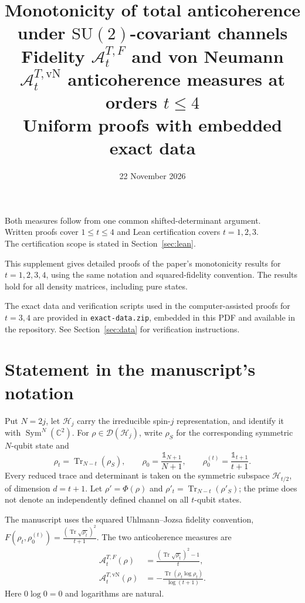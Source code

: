 \documentclass[11pt,a4paper]{article}
\title{Monotonicity of total anticoherence\\under $\mathrm{SU}(2)$-covariant channels\\[3mm]\large Fidelity $\mathcal A_t^{T,F}$ and von Neumann $\mathcal A_t^{T,\mathrm{vN}}$ anticoherence measures at orders $t\le4$\\Uniform proofs with embedded exact data}
\author{}
\date{22 November 2026}
\newcommand{\A}{\mathcal A}
\newcommand{\Tr}{\operatorname{Tr}}
\newcommand{\id}{\mathds{1}}
\newcommand{\D}{\mathcal D}
\begin{document}
\maketitle
\begin{center}\small
Both measures follow from one common shifted-determinant argument.\\
Written proofs cover $1\le t\le4$ and Lean certification covers $t=1,2,3$.\\
The certification scope is stated in Section~\ref{sec:lean}.
\end{center}
\vspace{12mm}
\noindent This supplement gives detailed proofs of the paper's monotonicity
results for $t=1,2,3,4$, using the same notation and squared-fidelity
convention. The results hold for all density matrices, including pure states.

\medskip
\noindent The exact data and verification scripts used in the
computer-assisted proofs for $t=3,4$ are provided in \texttt{exact-data.zip},
embedded in this PDF and available in the repository.
See Section~\ref{sec:data} for verification instructions.
\clearpage
{\small\tableofcontents}
\clearpage
\section{Statement in the manuscript's notation}
Put $N=2j$, let $\mathcal H_j$ carry the irreducible spin-$j$
representation, and identify it with $\operatorname{Sym}^N(\mathbb C^2)$.
For $\rho\in\D(\mathcal H_j)$, write $\rho_S$ for the corresponding
symmetric $N$-qubit state and
\[
 \rho_t=\Tr_{N-t}(\rho_S),\qquad
 \rho_0=\frac{\id_{N+1}}{N+1},\qquad
 \rho_0^{(t)}=\frac{\id_{t+1}}{t+1}.
\]
Every reduced trace and determinant is taken on the symmetric subspace
$\mathcal H_{t/2}$, of dimension $d=t+1$. Let $\rho'=\Phi(\rho)$
and $\rho'_t=\Tr_{N-t}(\rho'_S)$; the prime does not denote an
independently defined channel on all $t$-qubit states.

The manuscript uses the squared Uhlmann--Jozsa fidelity convention,
$F(\rho_t,\rho_0^{(t)})=\frac{(\Tr\sqrt{\rho_t})^2}{t+1}$.
The two anticoherence measures are
\begin{align}
 \A_t^{T,F}(\rho)&=\frac{(\Tr\sqrt{\rho_t})^2-1}{t},\label{eq:F}\\
 \A_t^{T,\mathrm{vN}}(\rho)&=
 -\frac{\Tr(\rho_t\log\rho_t)}{\log(t+1)}.\label{eq:VN}
\end{align}
Here $0\log0=0$ and logarithms are natural.
\end{document}

